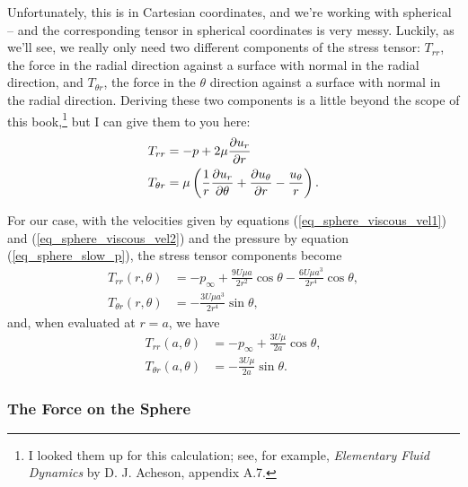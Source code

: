 Unfortunately, this is in Cartesian coordinates, and we're working with spherical -- and the corresponding tensor in spherical coordinates is very messy.  Luckily, as we'll see, we really only need two different components of the stress tensor:  $T_{rr}$, the force in the radial direction against a surface with normal in the radial direction, and $T_{\theta r}$, the force in the $\unit{\theta}$ direction against a surface with normal in the radial direction.  Deriving these two components is a little beyond the scope of this book,\footnote{I looked them up for this calculation; see, for example, \emph{Elementary Fluid Dynamics} by D. J. Acheson, appendix A.7.} but I can give them to you here:
\begin{align}
T_{rr} & = -p + 2\mu \frac{\partial {u_r}}{\partial {r}} \\
T_{\theta r} & = \mu \left( \frac{1}{r} \frac{\partial {u_r}}{\partial {\theta}} + \frac{\partial {u_\theta}}{\partial {r}} - \frac{u_\theta}{r} \right).
\end{align}

For our case, with the velocities given by equations (\ref{eq_sphere_viscous_vel1}) and (\ref{eq_sphere_viscous_vel2}) and the pressure by equation (\ref{eq_sphere_slow_p}), the stress tensor components become
\begin{align*}
T_{rr}(r, \theta) & = -p_\infty + \frac{9U \mu a}{2r^2} \cos\theta - \frac{6 U \mu a^3}{2r^4} \cos \theta, \\
T_{\theta r}(r, \theta) & = -\frac{3 U \mu a^3}{2r^4} \sin\theta,
\end{align*}
and, when evaluated at $r = a$, we have
\begin{align}
\label{eq_stress_rr}
T_{rr}(a, \theta) & = -p_\infty + \frac{3 U \mu}{2a} \cos \theta, \\
\label{eq_stress_thetar}
T_{\theta r}(a, \theta) & = -\frac{3 U \mu }{2a} \sin\theta.
\end{align}


\subsubsection{The Force on the Sphere}


